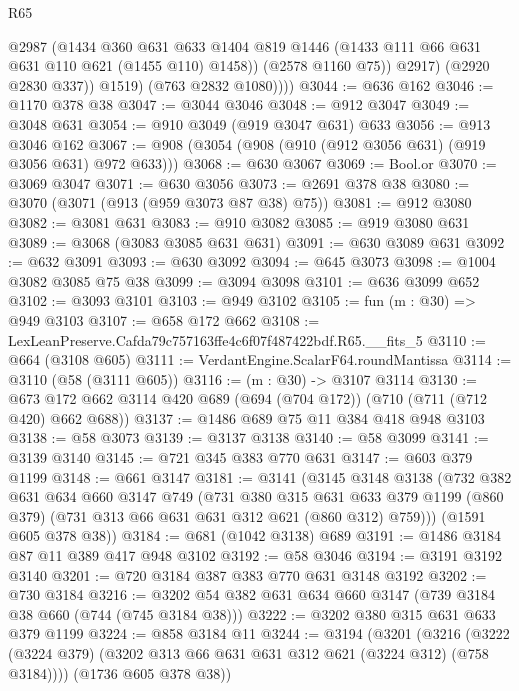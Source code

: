 \begin{lexlean}{R65}
\begin{coremodule}
                  @2987
                  (@1434
                    @360
                    @631
                    @633
                    @1404
                    @819
                    @1446
                    (@1433 @111 @66 @631 @631 @110 @621 (@1455 @110) @1458))
                  (@2578 @1160 @75))
                @2917)
              (@2920 @2830 @337))
            @1519)
          (@763 @2832 @1080))))
@3044 := @636 @162
@3046 := @1170 @378 @38
@3047 := @3044 @3046
@3048 := @912 @3047
@3049 := @3048 @631
@3054 := @910 @3049 (@919 @3047 @631) @633
@3056 := @913 @3046 @162
@3067 := @908 (@3054 (@908 (@910 (@912 @3056 @631) (@919 @3056 @631) @972 @633)))
@3068 := @630 @3067
@3069 := Bool.or
@3070 := @3069 @3047
@3071 := @630 @3056
@3073 := @2691 @378 @38
@3080 := @3070 (@3071 (@913 (@959 @3073 @87 @38) @75))
@3081 := @912 @3080
@3082 := @3081 @631
@3083 := @910 @3082
@3085 := @919 @3080 @631
@3089 := @3068 (@3083 @3085 @631 @631)
@3091 := @630 @3089 @631
@3092 := @632 @3091
@3093 := @630 @3092
@3094 := @645 @3073
@3098 := @1004 @3082 @3085 @75 @38
@3099 := @3094 @3098
@3101 := @636 @3099 @652
@3102 := @3093 @3101
@3103 := @949 @3102
@3105 := fun (m : @30) => @949 @3103
@3107 := @658 @172 @662
@3108 := LexLeanPreserve.Cafda79c757163ffe4c6f07f487422bdf.R65.__fits_5
@3110 := @664 (@3108 @605)
@3111 := VerdantEngine.ScalarF64.roundMantissa
@3114 := @3110 (@58 (@3111 @605))
@3116 := (m : @30) -> @3107 @3114
@3130 := @673 @172 @662 @3114 @420 @689 (@694 (@704 @172)) (@710 (@711 (@712 @420) @662 @688))
@3137 := @1486 @689 @75 @11 @384 @418 @948 @3103
@3138 := @58 @3073
@3139 := @3137 @3138
@3140 := @58 @3099
@3141 := @3139 @3140
@3145 := @721 @345 @383 @770 @631
@3147 := @603 @379 @1199
@3148 := @661 @3147
@3181 := @3141
    (@3145
      @3148
      @3138
      (@732
        @382
        @631
        @634
        @660
        @3147
        @749
        (@731
          @380
          @315
          @631
          @633
          @379
          @1199
          (@860 @379)
          (@731 @313 @66 @631 @631 @312 @621 (@860 @312) @759)))
      (@1591 @605 @378 @38))
@3184 := @681 (@1042 @3138) @689
@3191 := @1486 @3184 @87 @11 @389 @417 @948 @3102
@3192 := @58 @3046
@3194 := @3191 @3192 @3140
@3201 := @720 @3184 @387 @383 @770 @631 @3148 @3192
@3202 := @730 @3184
@3216 := @3202 @54 @382 @631 @634 @660 @3147 (@739 @3184 @38 @660 (@744 (@745 @3184 @38)))
@3222 := @3202 @380 @315 @631 @633 @379 @1199
@3224 := @858 @3184 @11
@3244 := @3194
    (@3201
      (@3216 (@3222 (@3224 @379) (@3202 @313 @66 @631 @631 @312 @621 (@3224 @312) (@758 @3184))))
      (@1736 @605 @378 @38))

\end{coremodule}
\end{lexlean}
